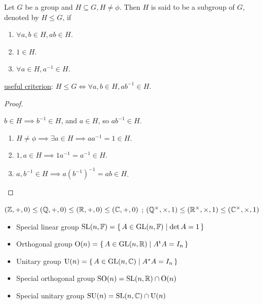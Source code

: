 \begin{definition}
  Let $G$ be a group and $H \subseteq G, H \ne \phi$.
  Then $H$ is said to be a subgroup of $G$, denoted by $H \le G$, if
  \begin{enumerate}
    \item $\forall a, b \in H, ab \in H$.
    \item $1 \in H$.
    \item $\forall a \in H, a^{-1} \in H$.
  \end{enumerate}
  \underline{useful criterion}:
  $H \le G \iff \forall a, b \in H, ab^{-1} \in H$.
  \begin{proof} \mbox{}
    \begin{description}[style=nextline]
      \item[$\Rightarrow$] $b \in H \implies b^{-1} \in H$, and $a \in H$, so
        $a b^{-1} \in H$.
      \item[$\Leftarrow$]
        \begin{enumerate}
          \item $H \ne \phi \implies \exists a \in H \implies
            aa^{-1} = 1 \in H$.
          \item $1, a \in H \implies 1 a^{-1} = a^{-1} \in H$.
          \item $a, b^{-1} \in H \implies a (b^{-1})^{-1} = ab \in H$.
            \qedhere
        \end{enumerate}
    \end{description}
  \end{proof}
\end{definition}

\begin{example}
  $(\mathbb{Z}, +, 0) \le (\mathbb{Q}, +, 0) \le (\mathbb{R}, +, 0) \le (\mathbb{C}, +, 0)$ ;
  $(\mathbb{Q}^\times, \times, 1) \le (\mathbb{R}^\times, \times, 1) \le (\mathbb{C}^\times, \times, 1)$
\end{example}

\begin{example} \mbox{}
  \begin{itemize}
    \item Special linear group $\text{SL}(n, \mathbb{F}) = \{\, A \in
      \text{GL}(n, \mathbb{F}) \mid \det A = 1 \,\}$
    \item Orthogonal group $\text{O}(n) = \{\, A \in \text{GL}(n, \mathbb{R})
      \mid {A}^\mathrm{t} A = I_n \,\}$
    \item Unitary group $\text{U}(n) = \{\, A \in \text{GL}(n, \mathbb{C}) \mid
      A^* A = I_n \,\}$
    \item Special orthogonal group $\text{SO}(n) = \text{SL}(n, \mathbb{R}) \cap
      \text{O}(n)$
    \item Special unitary group $\text{SU}(n) = \text{SL}(n, \mathbb{C}) \cap
      \text{U}(n)$
  \end{itemize}
\end{example}

